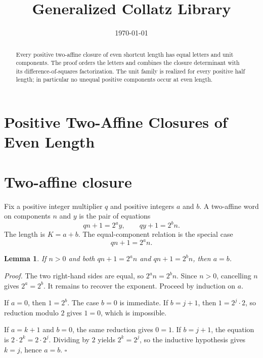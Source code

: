 \documentclass[11pt,letterpaper]{article}
\title{Generalized Collatz Library}
\author{}
\date{\today}
\newtheorem{lemma}[theorem]{Lemma}
\newenvironment{proof}{\noindent\textit{Proof.}}{\hfill\(\square\)}
\begin{document}
\maketitle
\section*{Positive Two-Affine Closures of Even Length}

\begin{abstract}
Every positive two-affine closure of even shortcut length has equal letters and unit components. The proof orders the letters and combines the closure determinant with its difference-of-squares factorization. The unit family is realized for every positive half length; in particular no unequal positive components occur at even length.
\end{abstract}

\section{Two-affine closure}

Fix a positive integer multiplier \(q\) and positive integers \(a\) and \(b\). A two-affine word on components \(n\) and \(y\) is the pair of equations
\begin{equation}
\label{eq:two-affine}
q n + 1 = 2^{a} y, \qquad q y + 1 = 2^{b} n.
\end{equation}
The length is \(K = a + b\). The equal-component relation is the special case
\begin{equation}
\label{eq:equal-closure}
q n + 1 = 2^{a} n.
\end{equation}

\begin{lemma}
\label{lem:letters}
If \(n > 0\) and both \(q n + 1 = 2^{a} n\) and \(q n + 1 = 2^{b} n\), then \(a = b\).
\end{lemma}

\begin{proof}
The two right-hand sides are equal, so \(2^{a} n = 2^{b} n\). Since \(n > 0\), cancelling \(n\) gives \(2^{a} = 2^{b}\). It remains to recover the exponent. Proceed by induction on \(a\).

If \(a = 0\), then \(1 = 2^{b}\). The case \(b = 0\) is immediate. If \(b = j + 1\), then \(1 = 2^{j} \cdot 2\), so reduction modulo \(2\) gives \(1 = 0\), which is impossible.

If \(a = k + 1\) and \(b = 0\), the same reduction gives \(0 = 1\). If \(b = j + 1\), the equation is \(2 \cdot 2^{k} = 2 \cdot 2^{j}\). Dividing by \(2\) yields \(2^{k} = 2^{j}\), so the inductive hypothesis gives \(k = j\), hence \(a = b\).
\end{proof}
\end{document}
